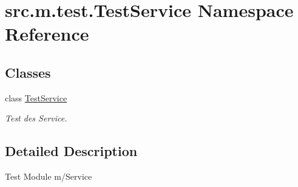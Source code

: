 \hypertarget{namespacesrc_1_1m_1_1test_1_1_test_service}{}\section{src.\+m.\+test.\+Test\+Service Namespace Reference}
\label{namespacesrc_1_1m_1_1test_1_1_test_service}
\subsection*{Classes}
\begin{DoxyCompactItemize}
\item 
class \hyperlink{classsrc_1_1m_1_1test_1_1_test_service_1_1_test_service}{Test\+Service}
\begin{DoxyCompactList}\small\item\em Test des Service. \end{DoxyCompactList}\end{DoxyCompactItemize}


\subsection{Detailed Description}
\begin{DoxyVerb}    Test Module m/Service
\end{DoxyVerb}
 